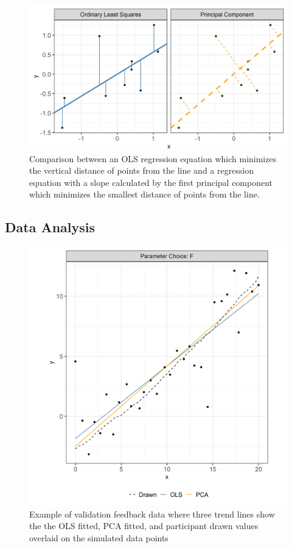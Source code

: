 \documentclass[10pt]{article}
\begin{document}
\begin{figure}[ht]
\begin{center}
\centerline{\includegraphics[width=\columnwidth]{images/pca-plot}}
\caption{Comparison between an OLS regression equation which minimizes the vertical distance of points from the line and a regression equation with a slope calculated by the first principal component which minimizes the smallest distance of points from the line.}
\label{pca-plot}
\end{center}
\end{figure}

\subsection{Data Analysis}

\begin{figure}[ht]
\begin{center}
\centerline{\includegraphics[width=\columnwidth]{images/eyefitting-trial-plot}}
\caption{Example of validation feedback data where three trend lines show the the OLS fitted, PCA fitted, and participant drawn values overlaid on the simulated data points}
\label{eyefitting-trial-plot}
\end{center}
\end{figure}
\end{document}
